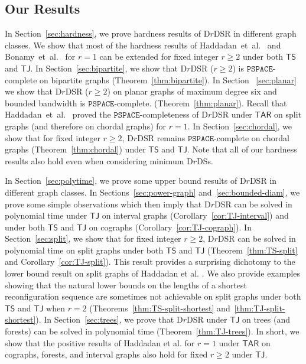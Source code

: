 \documentclass[a4paper]{article}
\theoremstyle{plain}
\theoremstyle{definition}
\newcommand{\sfTS}{{\mathsf{TS}}} %
\newcommand{\sfTJ}{{\mathsf{TJ}}} %
\newcommand{\sfTAR}{{\mathsf{TAR}}} %
\newcommand{\ttPSPACE}{{\mathtt{PSPACE}}}
\begin{document}
\subsection*{Our Results}
In Section~\ref{sec:hardness}, we prove hardness results of \textsc{D$r$DSR} in different graph classes.
We show that most of the hardness results of Haddadan~et~al.~\cite{HaddadanIMNOST16} and Bonamy~et~al.~\cite{BonamyDO21} for $r = 1$ can be extended for fixed integer $r \geq 2$ under both $\sfTS$ and $\sfTJ$.
In Section~\ref{sec:bipartite}, we show that \textsc{D$r$DSR} ($r \geq 2$) is $\ttPSPACE$-complete on bipartite graphs (Theorem~\ref{thm:bipartite}). In Section ~\ref{sec:planar} we show that \textsc{D$r$DSR} ($r \geq 2$) on planar graphs of maximum degree six and bounded bandwidth is $\ttPSPACE$-complete. (Theorem~\ref{thm:planar}).
Recall that Haddadan~et~al.~\cite{HaddadanIMNOST16} proved the $\ttPSPACE$-completeness of \textsc{D$r$DSR} under $\sfTAR$ on split graphs (and therefore on chordal graphs) for $r = 1$.
In Section~\ref{sec:chordal}, we show that for fixed integer $r \geq 2$, \textsc{D$r$DSR} remains $\ttPSPACE$-complete on chordal graphs (Theorem~\ref{thm:chordal}) under $\sfTS$ and $\sfTJ$. 
Note that all of our hardness results also hold even when considering minimum D$r$DSs.

In Section~\ref{sec:polytime}, we prove some upper bound results of  \textsc{D$r$DSR} in different graph classes. 
In Sections~\ref{sec:power-graph} and~\ref{sec:bounded-diam}, we prove some simple observations which then imply that \textsc{D$r$DSR} can be solved in polynomial time under $\sfTJ$ on interval graphs (Corollary~\ref{cor:TJ-interval}) and under both $\sfTS$ and $\sfTJ$ on cographs (Corollary~\ref{cor:TJ-cograph}).
In Section~\ref{sec:split}, we show that for fixed integer $r \geq 2$, \textsc{D$r$DSR} can be solved in polynomial time on split graphs under both $\sfTS$ and $\sfTJ$ (Theorem~\ref{thm:TS-split} and Corollary~\ref{cor:TJ-split}). 
This result provides a surprising dichotomy to the lower bound result on split graphs of Haddadan et al. \cite{HaddadanIMNOST16}. 
We also provide examples showing that the natural lower bounds on the lengths of a shortest reconfiguration sequence are sometimes not achievable on split graphs under both $\sfTS$ and $\sfTJ$ when $r = 2$ (Theorems~\ref{thm:TS-split-shortest} and~\ref{thm:TJ-split-shortest}).
In Section~\ref{sec:trees}, we prove that \textsc{D$r$DSR} under $\sfTJ$ on trees (and forests) can be solved in polynomial time (Theorem~\ref{thm:TJ-trees}). 
In short, we show that the positive results of Haddadan et al. \cite{HaddadanIMNOST16} for $r = 1$ under $\sfTAR$ on cographs, forests, and interval graphs also hold for fixed $r \geq 2$ under $\sfTJ$.
\end{document}
